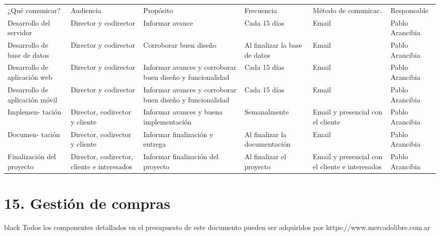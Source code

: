 \documentclass[11pt]{charter}
\begin{document}
\begin{table}[htpb]
\centering
\begin{tabularx}{\linewidth}{@{}|X|C{2.4cm}|C{3cm}|C{1.8cm}|C{2cm}|C{2.1cm}|@{}}
\hline
{} 
           \\ \hline
{} 
¿Qué comunicar? & Audiencia & Propósito & Frecuencia & Método de comunicac. & Responsable \\ \hline
 Desarrollo del servidor & Director y codirector&Informar avance&Cada 15 días&Email & Pablo Arancibia            \\ \hline
Desarrollo de base de datos & Director y codirector&Corroborar buen diseño&Al finalizar la base de datos&Email &Pablo Arancibia \\ \hline
Desarrollo de aplicación web & Director y codirector&Informar avances y corroborar buen diseño y funcionalidad &Cada 15 días &Email &Pablo Arancibia             \\ \hline
Desarrollo de aplicación móvil & Director y codirector&Informar avances y corroborar buen diseño y funcionalidad &Cada 15 días &Email &Pablo Arancibia\\ \hline
Implemen- tación & Director, codirector y cliente&Informar avances y buena implementación&Semanalmente&Email y presencial con el cliente  &Pablo Arancibia \\ \hline
Documen- tación & Director, codirector y cliente &Informar finalización y entrega&Al finalizar la documentación&Email &Pablo Arancibia             \\ \hline
Finalización del proyecto & Director, codirector, cliente  e interesados&Informar finalización del proyecto &Al finalizar el proyecto     &Email y presencial con el cliente e interesados  & Pablo Arancibia            \\ \hline
\end{tabularx}
\end{table}

\section{15. Gestión de compras}
\label{sec:compras}

\begin{consigna}{black}
Todos los componentes detallados en el presupuesto de este documento pueden ser adquiridos por https://www.mercadolibre.com.ar 
\end{consigna}
\end{document}
